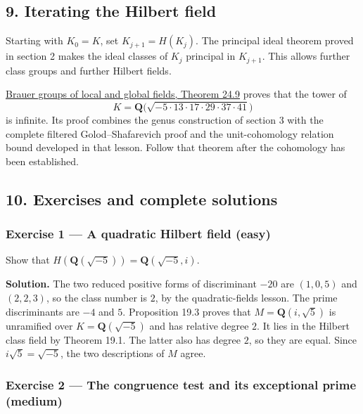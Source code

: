\documentclass[11pt,a4paper]{article}
\begin{document}
\subsection{9. Iterating the Hilbert
field}\label{iterating-the-hilbert-field}

Starting with \(K_0=K\), set \(K_{j+1}=H(K_j)\). The principal ideal
theorem proved in section 2 makes the ideal classes of \(K_j\) principal
in \(K_{j+1}\). This allows further class groups and further Hilbert
fields.

\href{brauer-groups-of-local-and-global-fields.md\#theorem-24-9-an-infinite-hilbert-class-field-tower}{Brauer
groups of local and global fields, Theorem 24.9} proves that the tower
of \[
K=\mathbf Q\bigl(\sqrt{-5\cdot13\cdot17\cdot29\cdot37\cdot41}\bigr)
\] is infinite. Its proof combines the genus construction of section 3
with the complete filtered Golod--Shafarevich proof and the
unit-cohomology relation bound developed in that lesson. Follow that
theorem after the cohomology has been established.

\subsection{10. Exercises and complete
solutions}\label{exercises-and-complete-solutions}

\subsubsection{Exercise 1 --- A quadratic Hilbert field
(easy)}\label{exercise-1-a-quadratic-hilbert-field-easy}

Show that \(H(\mathbf Q(\sqrt{-5}))=\mathbf Q(\sqrt{-5},i)\).

\textbf{Solution.} The two reduced positive forms of discriminant
\(-20\) are \((1,0,5)\) and \((2,2,3)\), so the class number is \(2\),
by the quadratic-fields lesson. The prime discriminants are \(-4\) and
\(5\). Proposition 19.3 proves that \(M=\mathbf Q(i,\sqrt5)\) is
unramified over \(K=\mathbf Q(\sqrt{-5})\) and has relative degree
\(2\). It lies in the Hilbert class field by Theorem 19.1. The latter
also has degree \(2\), so they are equal. Since \(i\sqrt5=\sqrt{-5}\),
the two descriptions of \(M\) agree.

\subsubsection{Exercise 2 --- The congruence test and its exceptional
prime
(medium)}\label{exercise-2-the-congruence-test-and-its-exceptional-prime-medium}
\end{document}
